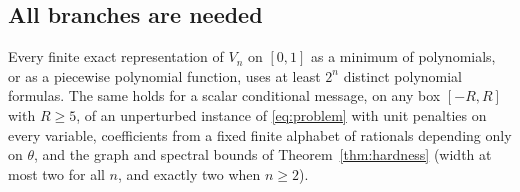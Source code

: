 \subsection{All branches are needed}
\label{sec:limits-all}
\begin{theorem}\label{thm:fixed-data}
Every finite exact representation of $V_n$ on $[0,1]$ as a minimum of
polynomials, or as a piecewise polynomial function, uses at least $2^n$
distinct polynomial formulas. The same holds for a scalar conditional
message, on any box $[-R,R]$ with $R\ge5$, of an unperturbed instance of
\eqref{eq:problem} with unit penalties on every variable, coefficients
from a fixed finite alphabet of rationals depending only on $\theta$,
and the graph and spectral bounds of Theorem~\ref{thm:hardness} (width
at most two for all $n$, and exactly two when $n\ge2$).
\end{theorem}
